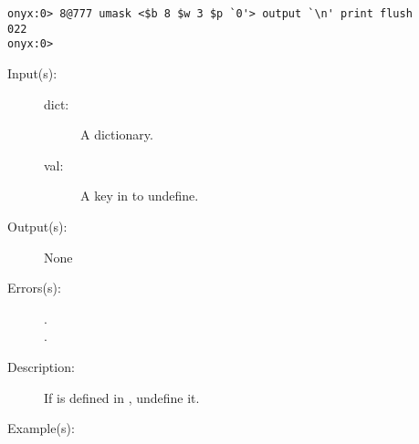 \begin{description}
\begin{description}
\begin{verbatim}
onyx:0> 8@777 umask <$b 8 $w 3 $p `0'> output `\n' print flush
022
onyx:0>
		\end{verbatim}
	\end{description}
\label{systemdict:undef}
\item[{\onyxop{dict key}{undef}{--}}: ]
	\begin{description}\item[]
	\item[Input(s): ]
		\begin{description}\item[]
		\item[dict: ]
			A dictionary.
		\item[val: ]
			A key in  to undefine.
		\end{description}
	\item[Output(s): ] None
	\item[Errors(s): ]
		\begin{description}\item[]
		\item[.]
		\item[.]
		\end{description}
	\item[Description: ]
		If  is defined in , undefine it.
	\item[Example(s): ]\begin{verbatim}


\end{verbatim}
\end{description}
\end{description}
